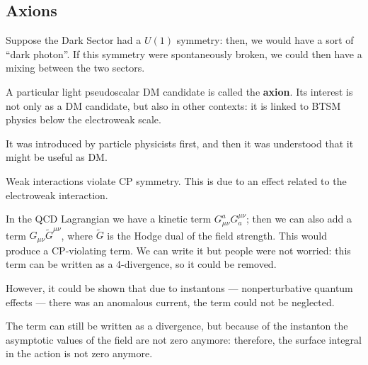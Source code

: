 \documentclass[main.tex]{subfiles}
\begin{document}
\subsection{Axions}






Suppose the Dark Sector had a \(U(1)\) symmetry: then, we would have a sort of ``dark photon''. 
If this symmetry were spontaneously broken, we could then have a mixing between the two sectors.

A particular light pseudoscalar DM candidate is called the \textbf{axion}. 
Its interest is not only as a DM candidate, but also in other contexts: it is linked to BTSM physics below the electroweak scale.

It was introduced by particle physicists first, and then it was understood that it might be useful as DM.

Weak interactions violate CP symmetry. This is due to an effect related to the electroweak interaction. 

In the QCD Lagrangian we have a kinetic term \(G_{\mu \nu }^{a} G^{\mu \nu }_{a}\); then we can also add a term \(G_{\mu \nu } \widetilde{G}^{\mu \nu }\), where \(\widetilde{G}\) is the Hodge dual of the field strength.
This would produce a CP-violating term. We can write it but people were not worried: this term can be written as a 4-divergence, so it could be removed.

However, it could be shown that due to instantons --- nonperturbative quantum effects --- there was an anomalous current, the term could not be neglected. 

The term can still be written as a divergence, but because of the instanton the asymptotic values of the field are not zero anymore: therefore, the surface integral in the action is not zero anymore. 
\end{document}
